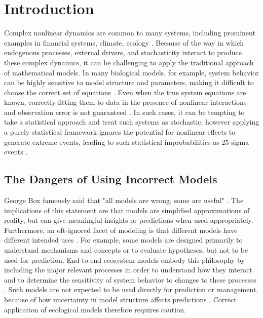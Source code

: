 \chapter{Introduction}
\label{chap_introductiont}

Complex nonlinear dynamics are common to many systems, including prominent examples in financial systems, climate, ecology \cite{May_2008, Scheffer_2009}. Because of the way in which endogenous processes, external drivers, and stochasticity interact to produce these complex dynamics, it can be challenging to apply the traditional approach of mathematical models. In many biological models, for example, system behavior can be highly sensitive to model structure and parameters, making it difficult to choose the correct set of equations \cite{Wood_1999}. Even when the true system equations are known, correctly fitting them to data in the presence of nonlinear interactions and observation error is not guaranteed \cite{Perretti_2013}. In such cases, it can be tempting to take a statistical approach and treat such systems as stochastic; however applying a purely statistical framework ignores the potential for nonlinear effects to generate extreme events, leading to such statistical improbabilities as 25-sigma events \cite{Dowd_2011}. 

\section{The Dangers of Using Incorrect Models}

George Box famously said that "all models are wrong, some are useful" \cite{Box_1987}. The implications of this statement are that models are simplified approximations of reality, but can give meaningful insights or predictions when used appropriately. Furthermore, an oft-ignored facet of modeling is that different models have different intended uses \cite{Peters_1991}. For example, some models are designed primarily to understand mechanisms and concepts or to evaluate hypotheses, but not to be used for prediction. End-to-end ecosystem models embody this philosophy by including the major relevant processes in order to understand how they interact and to determine the sensitivity of system behavior to changes to these processes \cite{Fulton_2010}. Such models are not expected to be used directly for prediction or management, because of how uncertainty in model structure affects predictions \cite{Kaplan_2013}. Correct application of ecological models therefore requires caution.

